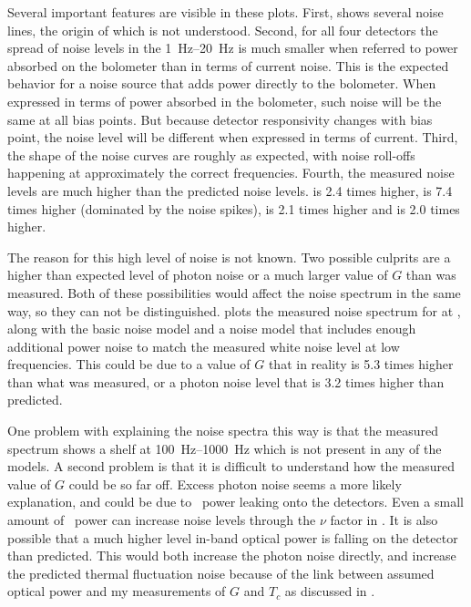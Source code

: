 Several important features are visible in these plots.
First,  shows several noise lines, the origin of which is not understood.
Second, for all four detectors the spread of noise levels in the \SIrange{1}{20}{\hertz} is much smaller when referred to power absorbed on the bolometer than in terms of current noise.
This is the expected behavior for a noise source that adds power directly to the bolometer.
When expressed in terms of power absorbed in the bolometer, such noise will be the same at all bias points.
But because detector responsivity changes with bias point, the noise level will be different when expressed in terms of current.
Third, the shape of the noise curves are roughly as expected, with noise roll-offs happening at approximately the correct frequencies.
Fourth, the measured noise levels are much higher than the predicted noise levels.
 is 2.4 times higher,  is 7.4 times higher (dominated by the noise spikes),  is 2.1 times higher and  is 2.0 times higher.

The reason for this high level of noise is not known.
Two possible culprits are a higher than expected level of photon noise or a much larger value of $G$ than was measured.
Both of these possibilities would affect the noise spectrum in the same way, so they can not be distinguished.
 plots the measured noise spectrum for  at \SOC, along with the basic noise model and a noise model that includes enough additional power noise to match the measured white noise level at low frequencies.
This could be due to a value of $G$ that in reality is 5.3 times higher than what was measured, or a photon noise level that is 3.2 times higher than predicted.

One problem with explaining the noise spectra this way is that the measured spectrum shows a shelf at \SIrange{100}{1000}{\hertz} which is not present in any of the models.
A second problem is that it is difficult to understand how the measured value of $G$ could be so far off.
Excess photon noise seems a more likely explanation, and could be due to \IR\ power leaking onto the detectors.
Even a small amount of \IR\ power can increase noise levels through the $\nu$ factor in .
It is also possible that a much higher level in-band optical power is falling on the detector than predicted.
This would both increase the photon noise directly, and increase the predicted thermal fluctuation noise because of the link between assumed optical power and my measurements of $G$ and $T_c$ as discussed in .

